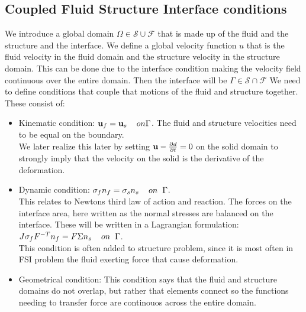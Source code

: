 \subsection*{Coupled Fluid Structure Interface conditions}
We introduce a global domain $\Omega \in \mathcal{S} \cup \mathcal{F} $ that is made up of the fluid and the structure and the interface. We define a global velocity function $u$ that is the fluid velocity in the fluid domain and the structure velocity in the structure domain. This can be done due to the interface condition making the velocity field continuous over the entire domain. Then the interface will be $ \Gamma \in \mathcal{S} \cap \mathcal{F}  $  
We need to define conditions that couple that motions of the fluid and structure together. These consist of:

\begin{itemize}
\item Kinematic condition: $\bold{u}_f = \bold{u}_s  \hspace{4mm} on \Gamma$. The fluid and structure velocities need to be equal on the boundary. \\
We later realize this later by setting  $\bold{u}- \frac{\partial d}{\partial t}  = 0  $ on the solid domain to strongly imply that the velocity on the solid is the derivative of the deformation.  
\item Dynamic condition: $  \sigma_f n_f = \sigma_s n_s \hspace{4mm} on  \hspace{2mm}\Gamma   $. \\
	This relates to Newtons third law of action and reaction. The forces on the interface area, here written as the normal stresses are balanced on the interface. These will be written in a Lagrangian formulation: \\
	$J\sigma_f F^{-T} n_f = F\Sigma n_s \hspace{4mm} on  \hspace{2mm}\Gamma $. \\
	This condition is often added to structure problem, since it is most often in FSI problem the fluid exerting force that cause deformation.
\item Geometrical condition: This condition says that the fluid and structure domains do not overlap, but rather that elements connect so the functions needing to transfer force are continouos across the entire domain.
\end{itemize}

